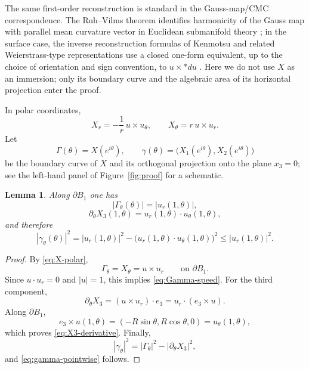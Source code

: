 \documentclass[11pt]{amsart}
\numberwithin{equation}{section}
\newtheorem{lemma}[theorem]{Lemma}
\theoremstyle{remark}
\begin{document}
The same first-order reconstruction is standard in the Gauss-map/CMC correspondence. The Ruh--Vilms theorem identifies harmonicity of the
Gauss map with parallel mean curvature vector in Euclidean submanifold theory \cite{RuhVilms1970}; in the surface case, the inverse
reconstruction formulas of Kenmotsu and related Weierstrass-type representations use a closed one-form equivalent, up to the choice of
orientation and sign convention, to \(u\times *du\) \cite{Kenmotsu1979}. Here we do not use \(X\) as an immersion; only its boundary curve and
the algebraic area of its horizontal projection enter the proof.

In polar coordinates,
\begin{equation}\label{eq:X-polar}
X_r=-\frac1r\,u\times u_\theta,
\qquad
X_\theta=r\,u\times u_r.
\end{equation}
Let
\[
\Gamma(\theta)=X(e^{i\theta}),
\qquad
\gamma(\theta)=\bigl(X_1(e^{i\theta}),X_2(e^{i\theta})\bigr)
\]
be the boundary curve of $X$ and its orthogonal projection onto the plane $x_3=0$; see the left-hand panel of Figure~\ref{fig:proof} for a
schematic.

\begin{lemma}\label{lem:length-height}
Along $\partial B_1$ one has
\begin{equation}\label{eq:Gamma-speed}
|\Gamma_\theta(\theta)|=|u_r(1,\theta)|,
\end{equation}
\begin{equation}\label{eq:X3-derivative}
\partial_\theta X_3(1,\theta)=u_r(1,\theta)\cdot u_\theta(1,\theta),
\end{equation}
and therefore
\begin{equation}\label{eq:gamma-pointwise}
|\gamma_\theta(\theta)|^2
=
|u_r(1,\theta)|^2-\bigl(u_r(1,\theta)\cdot u_\theta(1,\theta)\bigr)^2
\le |u_r(1,\theta)|^2.
\end{equation}
\end{lemma}

\begin{proof}
By \eqref{eq:X-polar},
\[
\Gamma_\theta=X_\theta=u\times u_r
\qquad\text{on }\partial B_1.
\]
Since $u\cdot u_r=0$ and $|u|=1$, this implies \eqref{eq:Gamma-speed}. For the third component,
\[
\partial_\theta X_3=(u\times u_r)\cdot e_3=u_r\cdot(e_3\times u).
\]
Along $\partial B_1$,
\[
e_3\times u(1,\theta)=(-R\sin\theta,R\cos\theta,0)=u_\theta(1,\theta),
\]
which proves \eqref{eq:X3-derivative}. Finally,
\[
|\gamma_\theta|^2=|\Gamma_\theta|^2-|\partial_\theta X_3|^2,
\]
and \eqref{eq:gamma-pointwise} follows.
\end{proof}
\end{document}
